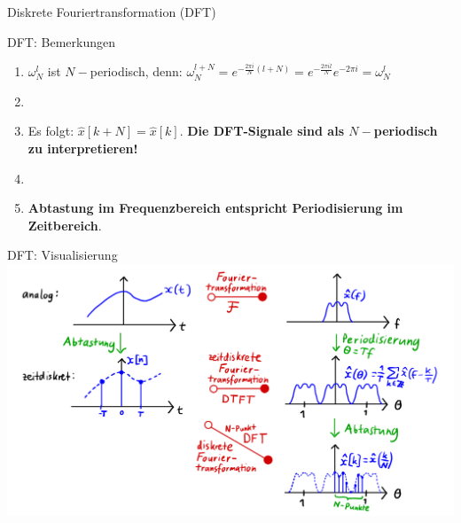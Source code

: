 \documentclass[14pt, aspectratio=169, handout]{beamer}
\begin{document}
\begin{frame}{Diskrete Fouriertransformation (DFT)}
\end{frame}

\begin{frame}{DFT: Bemerkungen}
    \begin{enumerate}
    \item $\omega_N^l$ ist $N-$periodisch, denn: $\omega_N^{l + N} = e^{-\frac{2 \pi i}{N}(l+N)} = e^{-\frac{2 \pi i l}{N}} e^{- 2 \pi i} = \omega_N^l$
    \item[] 
    \item Es folgt: $\hat{x}[k+N] = \hat{x}[k]$. \textbf{Die DFT-Signale sind als $N-$periodisch zu interpretieren!}
    \item[] 
    \item \textbf{Abtastung im Frequenzbereich entspricht Periodisierung im Zeitbereich}.
\end{enumerate}
\end{frame}

\begin{frame}{DFT: Visualisierung}
    \includegraphics[width=0.95\linewidth]{figures/DFT_visuals.jpeg}
\end{frame}
\end{document}
